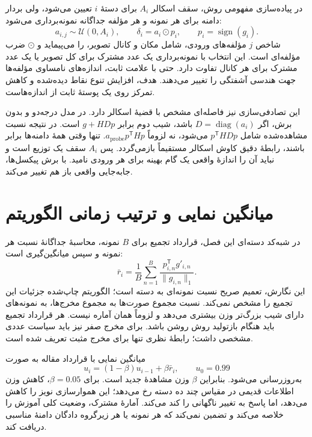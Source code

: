 در پیاده‌سازی مفهومی روش، سقف اسکالر $A_i$ برای دستهٔ $i$ تعیین می‌شود، ولی بردار دامنه برای هر نمونه و هر مؤلفه جداگانه نمونه‌برداری می‌شود:
\begin{equation}
a_{i,j}\sim\mathcal{U}(0,A_i),\qquad
\delta_i=a_i\odot p_i,\qquad p_i=\operatorname{sign}(g_i).
\label{eq:method-elementwise}
\end{equation}
شاخص $j$ مؤلفه‌های ورودی، شامل مکان و کانال تصویر، را می‌پیماید و $\odot$ ضرب مؤلفه‌ای است. این انتخاب با نمونه‌برداری یک عدد مشترک برای کل تصویر یا یک عدد مشترک برای هر کانال تفاوت دارد. حتی با علامت ثابت، اندازه‌های نامساوی مؤلفه‌ها جهت هندسی آشفتگی را تغییر می‌دهند. هدف، افزایش تنوع نقاط دیده‌شده و کاهش تمرکز روی یک پوستهٔ ثابت از اندازه‌هاست.

این تصادفی‌سازی نیز فاصله‌ای مشخص با قضیهٔ اسکالر دارد. در مدل درجه‌دو و بدون برش، اگر $D=\operatorname{diag}(a_i)$ باشد، شیب دوم برابر $g+HDp$ است. در نتیجه نسبت مشاهده‌شده شامل $p^{\mathsf T}HDp$ می‌شود، نه لزوماً $a_{\mathrm{probe}}p^{\mathsf T}Hp$. تنها وقتی همهٔ دامنه‌ها برابر باشند، رابطهٔ دقیق کاوش اسکالر مستقیماً بازمی‌گردد. پس $A_i$ سقف یک توزیع است و نباید آن را اندازهٔ واقعی یک گام بهینه برای هر ورودی نامید. با برش پیکسل‌ها، جابه‌جایی واقعی باز هم تغییر می‌کند.

\section{میانگین نمایی و ترتیب زمانی الگوریتم}
\label{sec:method-lag}

در شبه‌کد دسته‌ای این فصل، قرارداد تجمیع برای $B$ نمونه، محاسبهٔ جداگانهٔ نسبت هر نمونه و سپس میانگین‌گیری است:
\begin{equation}
\bar r_i=\frac{1}{B}\sum_{n=1}^{B}
\frac{p_{i,n}^{\mathsf T}g'_{i,n}}{\|g_{i,n}\|_1}.
\label{eq:method-batch-ratio}
\end{equation}
این نگارش، تعمیم صریح نسبت نمونه‌ای به دسته است؛ الگوریتم چاپ‌شده جزئیات این تجمیع را مشخص نمی‌کند. نسبت مجموع صورت‌ها به مجموع مخرج‌ها، به نمونه‌های دارای شیب بزرگ‌تر وزن بیشتری می‌دهد و لزوماً همان آماره نیست. هر قرارداد تجمیع باید هنگام بازتولید روش روشن باشد. برای مخرج صفر نیز باید سیاست عددی مشخصی داشت؛ رابطهٔ نظری تنها برای مخرج مثبت تعریف شده است.

میانگین نمایی با قرارداد مقاله به صورت
\begin{equation}
u_i=(1-\beta)u_{i-1}+\beta\bar r_i,\qquad u_0=0.99
\label{eq:method-ema}
\end{equation}
به‌روزرسانی می‌شود. بنابراین $\beta$ وزن مشاهدهٔ جدید است. برای $\beta=0.05$، کاهش وزن اطلاعات قدیمی در مقیاس چند ده دسته رخ می‌دهد؛ این هموارسازی نویز را کاهش می‌دهد، اما پاسخ به تغییر ناگهانی را کند می‌کند. آمارهٔ مشترک، وضعیت کلی آموزش را خلاصه می‌کند و تضمین نمی‌کند که هر نمونه یا هر زیرگروه دادگان دامنهٔ مناسبی دریافت کند.


